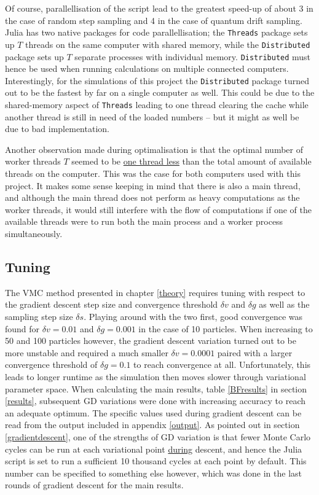 \documentclass[a4paper,8pt]{article}
\begin{document}
\begin{multicols}{2}
Of course, parallellisation of the script lead to the greatest speed-up of about 3 in the case of random step sampling and 4 in the case of quantum drift sampling. Julia has two native packages for code parallellisation; the \texttt{Threads} package sets up $T$ threads on the same computer with shared memory, while the \texttt{Distributed} package sets up $T$ separate processes with individual memory. \texttt{Distributed} must hence be used when running calculations on multiple connected computers. Interestingly, for the simulations of this project the \texttt{Distributed} package turned out to be the fastest by far on a single computer as well. This could be due to the shared-memory aspect of \texttt{Threads} leading to one thread clearing the cache while another thread is still in need of the loaded numbers -- but it might as well be due to bad implementation.

Another observation made during optimalisation is that the optimal number of worker threads $T$ seemed to be \underline{one thread less} than the total amount of available threads on the computer. This was the case for both computers used with this project. It makes some sense keeping in mind that there is also a main thread, and although the main thread does not perform as heavy computations as the worker threads, it would still interfere with the flow of computations if one of the available threads were to run both the main process and a worker process simultaneously.


\subsection{Tuning}\label{tuning}
The VMC method presented in chapter \ref{theory} requires tuning with respect to the gradient descent step size and convergence threshold $\delta v$ and $\delta g$ as well as the sampling step size $\delta s$. Playing around with the two first, good convergence was found for ${\delta v = 0.01}$ and ${\delta g = 0.001}$ in the case of 10 particles. When increasing to 50 and 100 particles however, the gradient descent variation turned out to be more unstable and required a much smaller ${\delta v = 0.0001}$ paired with a larger convergence threshold of ${\delta g = 0.1}$ to reach convergence at all. Unfortunately, this leads to longer runtime as the simulation then moves slower through variational parameter space. When calculating the main results, table \ref{BFresults} in section \ref{results}, subsequent GD variations were done with increasing accuracy to reach an adequate optimum. The specific values used during gradient descent can be read from the output included in appendix \ref{output}. As pointed out in section \ref{gradientdescent}, one of the strengths of GD variation is that fewer Monte Carlo cycles can be run at each variational point \underline{during} descent, and hence the Julia script is set to run a sufficient 10 thousand cycles at each point by default. This number can be specified to something else however, which was done in the last rounds of gradient descent for the main results.


\end{multicols}
\end{document}
